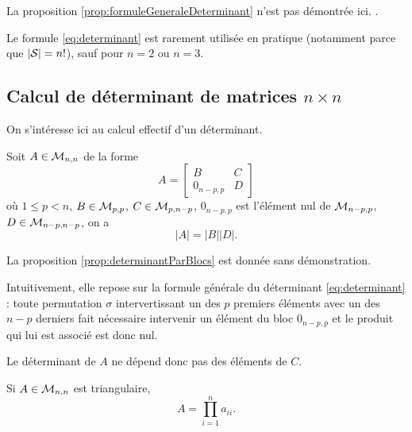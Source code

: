 \proof 
La proposition \ref{prop:formuleGeneraleDeterminant} n'est pas démontrée ici. 
\eproof.

\remark
Le formule \eqref{eq:determinant} est rarement utilisée en pratique (notamment parce que $|\mathcal{S}| = n!$), sauf pour $n=2$ ou $n=3$.

\subsection{Calcul de déterminant de matrices $n \times n$} 

On s'intéresse ici au calcul effectif d'un déterminant.

\begin{proposition} \label{prop:determinantParBlocs}
  Soit $A \in \mathcal{M}_{n,n}$ de la forme
  $$
  A = \left[\begin{array}{cc}
      B & C \\ 0_{n-p, p} & D
    \end{array}\right]
  $$
  où $1 \leq p < n$, $B \in \mathcal{M}_{p, p}$, $C \in \mathcal{M}_{p, n-p}$, $0_{n-p, p}$ est l'élément nul de $\mathcal{M}_{n-p, p}$, $D \in \mathcal{M}_{n-p, n-p}$, on a
  $$
  |A| = |B| |D|.
  $$
\end{proposition}

\proof
La proposition \ref{prop:determinantParBlocs} est donnée sans démonstration. 
\eproof

\remark 
Intuitivement, elle repose sur la formule générale du déterminant \eqref{eq:determinant} : toute permutation $\sigma$ intervertissant un des $p$ premiers éléments avec un des $n-p$ derniers fait nécessaire intervenir un élément du bloc $0_{n-p, p}$ et le produit qui lui est associé est donc nul.

\remark Le déterminant de $A$ ne dépend donc pas des éléments de $C$.

\begin{proposition} \label{prop:determinantMatriceTriangulaire}
  Si $A \in \mathcal{M}_{n,n}$ est triangulaire, 
  $$
  A = \prod_{i=1}^n a_{ii}.
  $$
\end{proposition}

